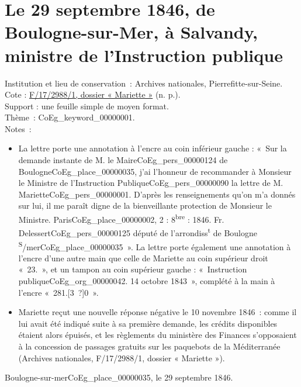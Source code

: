 \documentclass{book}
\begin{document}
\hypertarget{CoEg_Mariette_CoEg_Mariette_1846-09-29}{}

\section*{Le 29 septembre 1846, de Boulogne-sur-Mer, à Salvandy, ministre de l’Instruction publique}
 \label{labCoEg_Mariette_1846-09-29}
{\footnotesize
\noindent Institution et lieu de conservation~: Archives nationales, Pierrefitte-sur-Seine.\\
Cote : \hyperlink{CoEg_Mariette_ms_002}{F/17/2988/1, dossier « Mariette »} (n. p.).\\
Support : une feuille simple de moyen format.\\
Thème~: \gls{CoEg_keyword_00000001}.\\
Notes~:
\begin{itemize}
\item La lettre porte une annotation à l’encre au coin inférieur gauche : «~Sur la demande instante de M. le Maire\gls{CoEg_pers_00000124} de Boulogne\gls{CoEg_place_00000035}, j’ai l’honneur de recommander à Monsieur le Ministre de l’Instruction Publique\gls{CoEg_pers_00000090} la lettre de M. Mariette\gls{CoEg_pers_00000001}. D’après les renseignements qu’on m’a donnés sur lui, il me paraît digne de la bienveillante protection de Monsieur le Ministre. Paris\gls{CoEg_place_00000002}, 2 : 8\textsuperscript{bre} : 1846. Fr. Delessert\gls{CoEg_pers_00000125} député de l’arrondiss\textsuperscript{t} de Boulogne \textsuperscript{S}/mer\gls{CoEg_place_00000035}~». La lettre porte également une annotation à l’encre d’une autre main que celle de Mariette au coin supérieur droit «~23.~», et un tampon au coin supérieur gauche : «~Instruction publique\gls{CoEg_org_00000042}. 14 octobre 1843~», complété à la main à l’encre «~281.[3~?]0~».
\item Mariette reçut une nouvelle réponse négative le 10 novembre 1846~: comme il lui avait été indiqué suite à sa première demande, les crédits disponibles étaient alors épuisés, et les règlements du ministère des Finances s’opposaient à la concession de passages gratuits sur les paquebots de la Méditerranée (Archives nationales, F/17/2988/1, dossier « Mariette »).\end{itemize}}

\begin{flushright}Boulogne-sur-mer\gls{CoEg_place_00000035}, le 29 septembre 1846.\end{flushright}
\end{document}
